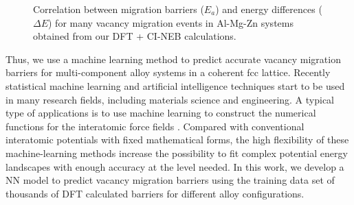 \begingroup
\begin{figure}[!ht]
  \centering
\caption[Correlation between migration barriers ($E_a$) and energy differences ($\Delta E$) for many vacancy migration events in Al-Mg-Zn systems.]{Correlation between migration barriers ($E_a$) and energy differences ($\Delta E$) for many vacancy migration events in Al-Mg-Zn systems obtained from our DFT +  \ac{CI-NEB} calculations.}
  \label{Chap:Al/Vac:fig2}
\end{figure}
\endgroup


Thus, we use a machine learning method to predict accurate vacancy migration barriers for multi-component alloy systems in a coherent fcc lattice. Recently statistical machine learning and artificial intelligence techniques start to be used in many research fields, including materials science and engineering. A typical type of applications is to use machine learning to construct the numerical functions for the interatomic force fields \cite{bartok2010gaussian,behler2011atom,szlachta2014accuracy,artrith2016implementation,mehta2014exact,artrith2017efficient}. Compared with conventional interatomic potentials with fixed mathematical forms, the high flexibility of these machine-learning methods increase the possibility to fit complex potential energy landscapes with enough accuracy at the level needed. In this work, we develop a \acf{NN} model to predict vacancy migration barriers using the training data set of thousands of \ac{DFT} calculated barriers for different alloy configurations. 


